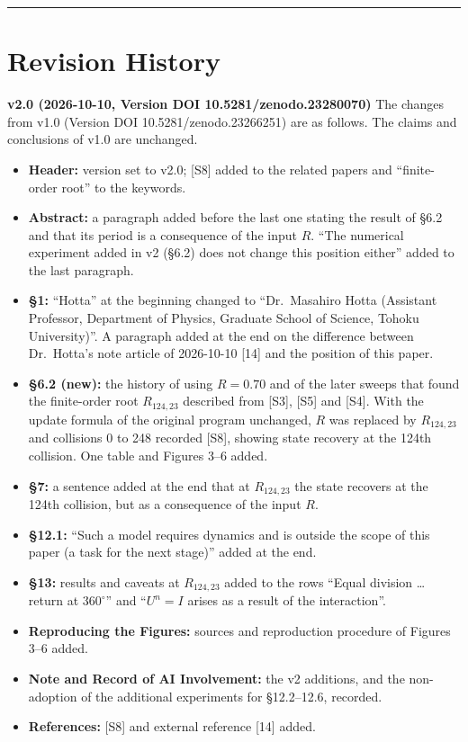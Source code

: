 \documentclass[
  a4paper,
]{article}
\providecommand{\tightlist}{%
  \setlength{\itemsep}{0pt}\setlength{\parskip}{0pt}}
\begin{document}
\begin{center}\rule{0.5\linewidth}{0.5pt}\end{center}

\section{Revision History}\label{revision-history}

\textbf{v2.0 (2026-10-10, Version DOI 10.5281/zenodo.23280070)} The
changes from v1.0 (Version DOI 10.5281/zenodo.23266251) are as follows.
The claims and conclusions of v1.0 are unchanged.

\begin{itemize}
\tightlist
\item
  \textbf{Header:} version set to v2.0; {[}S8{]} added to the related
  papers and ``finite-order root'' to the keywords.
\item
  \textbf{Abstract:} a paragraph added before the last one stating the
  result of §6.2 and that its period is a consequence of the input
  \(R\). ``The numerical experiment added in v2 (§6.2) does not change
  this position either'' added to the last paragraph.
\item
  \textbf{§1:} ``Hotta'' at the beginning changed to ``Dr.~Masahiro
  Hotta (Assistant Professor, Department of Physics, Graduate School of
  Science, Tohoku University)''. A paragraph added at the end on the
  difference between Dr.~Hotta's note article of 2026-10-10 {[}14{]} and
  the position of this paper.
\item
  \textbf{§6.2 (new):} the history of using \(R=0.70\) and of the later
  sweeps that found the finite-order root \(R_{124,23}\) described from
  {[}S3{]}, {[}S5{]} and {[}S4{]}. With the update formula of the
  original program unchanged, \(R\) was replaced by \(R_{124,23}\) and
  collisions 0 to 248 recorded {[}S8{]}, showing state recovery at the
  124th collision. One table and Figures 3--6 added.
\item
  \textbf{§7:} a sentence added at the end that at \(R_{124,23}\) the
  state recovers at the 124th collision, but as a consequence of the
  input \(R\).
\item
  \textbf{§12.1:} ``Such a model requires dynamics and is outside the
  scope of this paper (a task for the next stage)'' added at the end.
\item
  \textbf{§13:} results and caveats at \(R_{124,23}\) added to the rows
  ``Equal division \ldots{} return at \(360^\circ\)'' and ``\(U^n=I\)
  arises as a result of the interaction''.
\item
  \textbf{Reproducing the Figures:} sources and reproduction procedure
  of Figures 3--6 added.
\item
  \textbf{Note and Record of AI Involvement:} the v2 additions, and the
  non-adoption of the additional experiments for §12.2--12.6, recorded.
\item
  \textbf{References:} {[}S8{]} and external reference {[}14{]} added.
\end{itemize}
\end{document}
